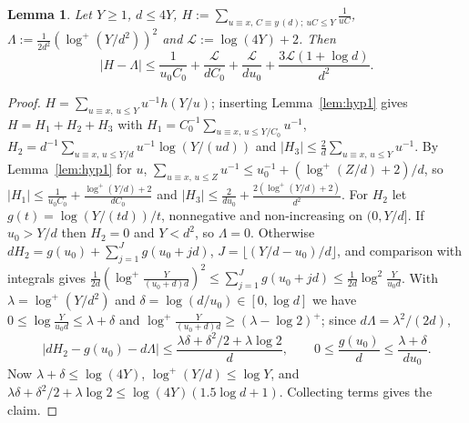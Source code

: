 \documentclass[11pt,reqno]{amsart}
\newtheorem{lemma}[theorem]{Lemma}
\theoremstyle{definition}
\begin{document}
\begin{lemma}\label{lem:hyp2}
Let $Y\ge1$, $d\le4Y$,
$H:=\sum_{u\equiv x,\,C\equiv y\,(d);\ uC\le Y}\frac1{uC}$,
$\Lambda:=\frac1{2d^2}(\log^+(Y/d^2))^2$ and $\mathcal L:=\log(4Y)+2$.  Then
\[
 |H-\Lambda|\le\frac1{u_0C_0}+\frac{\mathcal L}{dC_0}+\frac{\mathcal L}{du_0}
 +\frac{3\mathcal L(1+\log d)}{d^2}.
\]
\end{lemma}
\begin{proof}
$H=\sum_{u\equiv x,\,u\le Y}u^{-1}h(Y/u)$; inserting Lemma~\ref{lem:hyp1}
gives $H=H_1+H_2+H_3$ with
$H_1=C_0^{-1}\sum_{u\equiv x,\,u\le Y/C_0}u^{-1}$,
$H_2=d^{-1}\sum_{u\equiv x,\,u\le Y/d}u^{-1}\log(Y/(ud))$ and
$|H_3|\le\frac2d\sum_{u\equiv x,\,u\le Y}u^{-1}$.  By Lemma~\ref{lem:hyp1}
for $u$, $\sum_{u\equiv x,\,u\le Z}u^{-1}\le u_0^{-1}+(\log^+(Z/d)+2)/d$, so
$|H_1|\le\frac1{u_0C_0}+\frac{\log^+(Y/d)+2}{dC_0}$ and
$|H_3|\le\frac2{du_0}+\frac{2(\log^+(Y/d)+2)}{d^2}$.  For $H_2$ let
$g(t)=\log(Y/(td))/t$, nonnegative and non-increasing on $(0,Y/d]$.  If
$u_0>Y/d$ then $H_2=0$ and $Y<d^2$, so $\Lambda=0$.  Otherwise
$dH_2=g(u_0)+\sum_{j=1}^Jg(u_0+jd)$, $J=\lfloor(Y/d-u_0)/d\rfloor$, and
comparison with integrals gives
$\frac1{2d}(\log^+\frac Y{(u_0+d)d})^2\le\sum_{j=1}^Jg(u_0+jd)\le\frac1{2d}\log^2\frac
Y{u_0d}$.  With $\lambda=\log^+(Y/d^2)$ and $\delta=\log(d/u_0)\in[0,\log d]$
we have $0\le\log\frac Y{u_0d}\le\lambda+\delta$ and
$\log^+\frac{Y}{(u_0+d)d}\ge(\lambda-\log 2)^+$; since $d\Lambda=\lambda^2/(2d)$,
\[
 |dH_2-g(u_0)-d\Lambda|\le\frac{\lambda\delta+\delta^2/2+\lambda\log2}d,
 \qquad0\le\frac{g(u_0)}d\le\frac{\lambda+\delta}{du_0}.
\]
Now $\lambda+\delta\le\log(4Y)$, $\log^+(Y/d)\le\log Y$, and
$\lambda\delta+\delta^2/2+\lambda\log2\le\log(4Y)(1.5\log d+1)$.  Collecting
terms gives the claim.
\end{proof}
\end{document}
